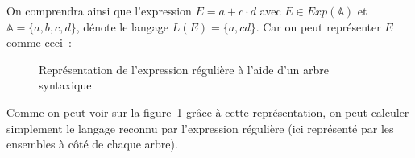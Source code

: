 \begin{example}
    On comprendra ainsi que l'expression \(E = a+c \cdot d\) avec \(E \in
    Exp(\mathbb{A})\) et \(\mathbb{A} = \{a, b, c, d\}\), dénote le langage
    \(L(E) = \{a, cd\}\). Car on peut représenter \(E\) comme ceci~:

    \begin{figure}[H]
        \centering
        \captionsetup{type=figure,justification=centering}
        \caption{
            Représentation de l'expression régulière à l'aide d'un arbre syntaxique
        }\label{fig:arbre_syn}
    \end{figure}

    Comme on peut voir sur la figure~\ref{fig:arbre_syn} grâce à cette
    représentation, on peut calculer simplement le langage reconnu par l'expression
    régulière (ici représenté par les ensembles à c\^{o}té de chaque arbre).
\end{example}

\vphantom{}

